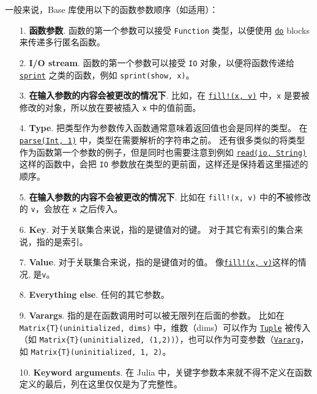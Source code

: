 一般来说，Base 库使用以下的函数参数顺序（如适用）：



\begin{itemize}
\item[1.  ] \textbf{函数参数}. 函数的第一个参数可以接受 \texttt{Function} 类型，以便使用 \hyperlink{16455129305818705265}{\texttt{do}} blocks 来传递多行匿名函数。


\item[2.  ] \textbf{I/O stream}. 函数的第一个参数可以接受 \texttt{IO} 对象，以便将函数传递给 \hyperlink{6652981552509545835}{\texttt{sprint}} 之类的函数，例如 \texttt{sprint(show, x)}。


\item[3.  ] \textbf{在输入参数的内容会被更改的情况下}. 比如，在 \hyperlink{5162290739791026948}{\texttt{fill!(x, v)}} 中，\texttt{x} 是要被修改的对象，所以放在要被插入 \texttt{x} 中的值前面。


\item[4.  ] \textbf{Type}. 把类型作为参数传入函数通常意味着返回值也会是同样的类型。 在 \hyperlink{14207407853646164654}{\texttt{parse(Int, {\textquotedbl}1{\textquotedbl})}} 中，类型在需要解析的字符串之前。 还有很多类似的将类型作为函数第一个参数的例子，但是同时也需要注意到例如 \hyperlink{8104134490906192097}{\texttt{read(io, String)}} 这样的函数中，会把 \texttt{IO} 参数放在类型的更前面，这样还是保持着这里描述的顺序。


\item[5.  ] \textbf{在输入参数的内容不会被更改的情况下}. 比如在 \texttt{fill!(x, v)} 中的\textbf{不}被修改的 \texttt{v}，会放在 \texttt{x} 之后传入。


\item[6.  ] \textbf{Key}. 对于关联集合来说，指的是键值对的键。 对于其它有索引的集合来说，指的是索引。


\item[7.  ] \textbf{Value}. 对于关联集合来说，指的是键值对的值。 像\hyperlink{5162290739791026948}{\texttt{fill!(x, v)}}这样的情况, 是\texttt{v}。


\item[8.  ] \textbf{Everything else}. 任何的其它参数。


\item[9.  ] \textbf{Varargs}. 指的是在函数调用时可以被无限列在后面的参数。 比如在 \texttt{Matrix\{T\}(uninitialized, dims)} 中，维数（dims）可以作为 \hyperlink{17462354060312563026}{\texttt{Tuple}} 被传入（如 \texttt{Matrix\{T\}(uninitialized, (1,2))}），也可以作为可变参数（\hyperlink{5941806424098279588}{\texttt{Vararg}}，如 \texttt{Matrix\{T\}(uninitialized, 1, 2)}。


\item[10. ] \textbf{Keyword arguments}. 在 Julia 中，关键字参数本来就不得不定义在函数定义的最后，列在这里仅仅是为了完整性。

\end{itemize}


